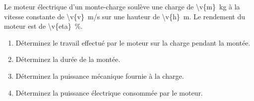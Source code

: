 Le moteur électrique d'un monte-charge soulève une charge de \qty{\v{m}}{kg} à la vitesse constante de \qty{\v{v}}{m/s} sur une hauteur de \qty{\v{h}}{m}. Le rendement du moteur est de \qty{\v{eta}}{\percent}.

\begin{enumerate}[label=\alph*)]
    \item Déterminez le travail effectué par le moteur sur la charge pendant la montée.
    \item Déterminez la durée de la montée.
    \item Déterminez la puissance mécanique fournie à la charge.
    \item Déterminez la puissance électrique consommée par le moteur.
\end{enumerate}

